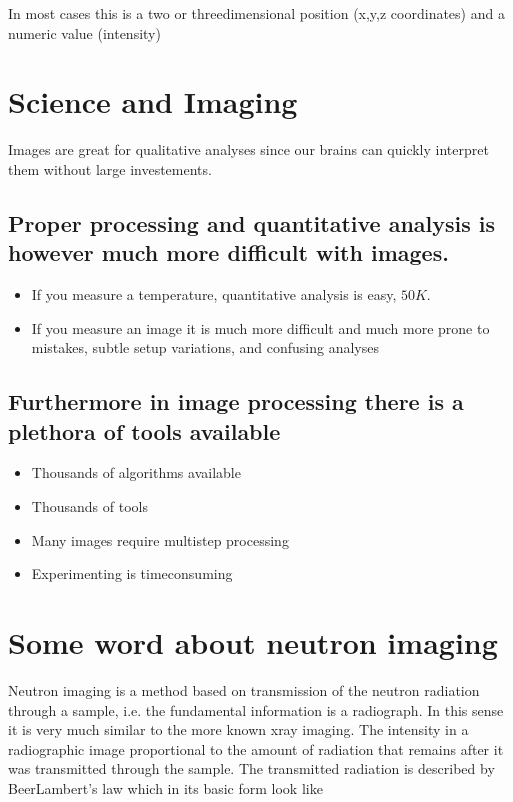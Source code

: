 \documentclass[letterpaper,10pt,english]{sphinxmanual}
\begin{document}
In most cases this is a two\sphinxhyphen{} or three\sphinxhyphen{}dimensional position (x,y,z coordinates) and a numeric value (intensity)


\section{Science and Imaging}
\label{\detokenize{ML4NeutronImageSegmentation:science-and-imaging}}
Images are great for qualitative analyses since our brains can quickly interpret them without large  investements.


\subsection{Proper processing and quantitative analysis is however much more difficult with images.}
\label{\detokenize{ML4NeutronImageSegmentation:proper-processing-and-quantitative-analysis-is-however-much-more-difficult-with-images}}\begin{itemize}
\item {} 
If you measure a temperature, quantitative analysis is easy, \(50K\).

\item {} 
If you measure an image it is much more difficult and much more prone to mistakes, subtle setup variations, and confusing analyses

\end{itemize}


\subsection{Furthermore in image processing there is a plethora of tools available}
\label{\detokenize{ML4NeutronImageSegmentation:furthermore-in-image-processing-there-is-a-plethora-of-tools-available}}\begin{itemize}
\item {} 
Thousands of algorithms available

\item {} 
Thousands of tools

\item {} 
Many images require multi\sphinxhyphen{}step processing

\item {} 
Experimenting is time\sphinxhyphen{}consuming

\end{itemize}


\section{Some word about neutron imaging}
\label{\detokenize{ML4NeutronImageSegmentation:some-word-about-neutron-imaging}}
Neutron imaging is a method based on transmission of the neutron radiation through a sample, i.e. the fundamental information is a radiograph. In this sense it is very much similar to the more known x\sphinxhyphen{}ray imaging. The intensity in a radiographic image proportional to the amount of radiation that remains after it was transmitted through the sample. The transmitted radiation is described by Beer\sphinxhyphen{}Lambert’s law which in its basic form look like
\end{document}
